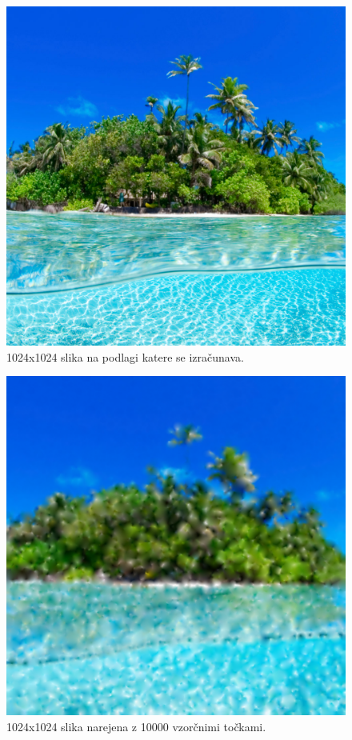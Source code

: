 \documentclass{egpubl}
\begin{document}
	\begin{figure}[!htb]
		\centering
		\parbox[t]{.75\columnwidth}{\relax
			\includegraphics[width=.95\linewidth]{1024x1024.jpg}
		}
		\caption{\label{fig:1024x1024_source}
			1024x1024 slika na podlagi katere se izračunava.}
	\end{figure}
	
	\begin{figure}[!htb]
		\centering
		\parbox[t]{.75\columnwidth}{\relax
			\includegraphics[width=.95\linewidth]{1024x1024x10000_result.png}
		}
		\caption{\label{fig:1024x1024x10000}
			1024x1024 slika narejena z 10000 vzorčnimi točkami.}
	\end{figure}
	
\end{document}
